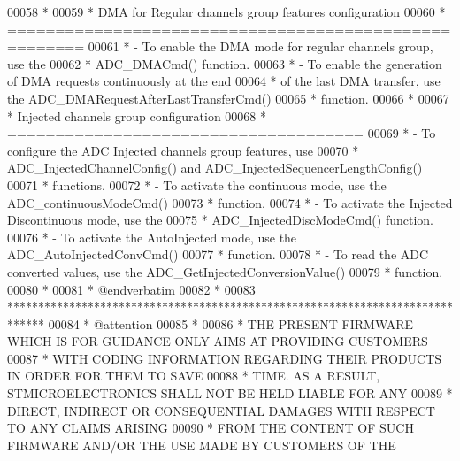 \begin{DoxyCode}
00058 \textcolor{comment}{  *}
00059 \textcolor{comment}{  *          DMA for Regular channels group features configuration}
00060 \textcolor{comment}{  *          ====================================================== }
00061 \textcolor{comment}{  *           - To enable the DMA mode for regular channels group, use the }
00062 \textcolor{comment}{  *             ADC\_DMACmd() function.}
00063 \textcolor{comment}{  *           - To enable the generation of DMA requests continuously at the end}
00064 \textcolor{comment}{  *             of the last DMA transfer, use the ADC\_DMARequestAfterLastTransferCmd() }
00065 \textcolor{comment}{  *             function.}
00066 \textcolor{comment}{  *}
00067 \textcolor{comment}{  *          Injected channels group configuration}
00068 \textcolor{comment}{  *          =====================================    }
00069 \textcolor{comment}{  *            - To configure the ADC Injected channels group features, use }
00070 \textcolor{comment}{  *              ADC\_InjectedChannelConfig() and  ADC\_InjectedSequencerLengthConfig()}
00071 \textcolor{comment}{  *              functions.}
00072 \textcolor{comment}{  *            - To activate the continuous mode, use the ADC\_continuousModeCmd()}
00073 \textcolor{comment}{  *              function.}
00074 \textcolor{comment}{  *            - To activate the Injected Discontinuous mode, use the }
00075 \textcolor{comment}{  *              ADC\_InjectedDiscModeCmd() function.  }
00076 \textcolor{comment}{  *            - To activate the AutoInjected mode, use the ADC\_AutoInjectedConvCmd() }
00077 \textcolor{comment}{  *              function.        }
00078 \textcolor{comment}{  *            - To read the ADC converted values, use the ADC\_GetInjectedConversionValue() }
00079 \textcolor{comment}{  *              function.}
00080 \textcolor{comment}{  *}
00081 \textcolor{comment}{  *  @endverbatim}
00082 \textcolor{comment}{  *}
00083 \textcolor{comment}{  ******************************************************************************}
00084 \textcolor{comment}{  * @attention}
00085 \textcolor{comment}{  *}
00086 \textcolor{comment}{  * THE PRESENT FIRMWARE WHICH IS FOR GUIDANCE ONLY AIMS AT PROVIDING CUSTOMERS}
00087 \textcolor{comment}{  * WITH CODING INFORMATION REGARDING THEIR PRODUCTS IN ORDER FOR THEM TO SAVE}
00088 \textcolor{comment}{  * TIME. AS A RESULT, STMICROELECTRONICS SHALL NOT BE HELD LIABLE FOR ANY}
00089 \textcolor{comment}{  * DIRECT, INDIRECT OR CONSEQUENTIAL DAMAGES WITH RESPECT TO ANY CLAIMS ARISING}
00090 \textcolor{comment}{  * FROM THE CONTENT OF SUCH FIRMWARE AND/OR THE USE MADE BY CUSTOMERS OF THE}

\end{DoxyCode}
